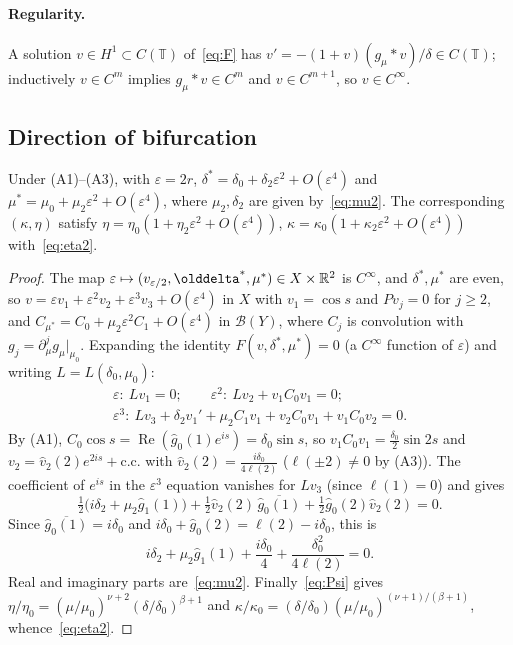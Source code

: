 \documentclass[11pt,a4paper]{report}
\providecommand{\T}{}
\renewcommand{\T}{\mathbb{T}}
\newcommand{\gh}{\hat g}
\begin{document}
\paragraph{Regularity.} A solution $v\in H^1\subset C(\T)$ of~\eqref{eq:F} has $v'=-(1+v)(g_\mu*v)/\delta\in C(\T)$; inductively $v\in C^m$ implies $g_\mu*v\in C^m$ and $v\in C^{m+1}$, so $v\in C^\infty$.

\subsection{Direction of bifurcation}
\begin{proposition}\label{prop:direction}
Under (A1)--(A3), with $\varepsilon=2r$, $\delta^*=\delta_0+\delta_2\varepsilon^2+O(\varepsilon^4)$ and $\mu^*=\mu_0+\mu_2\varepsilon^2+O(\varepsilon^4)$, where $\mu_2,\delta_2$ are given by~\eqref{eq:mu2}. The corresponding $(\kappa,\eta)$ satisfy $\eta=\eta_0(1+\eta_2\varepsilon^2+O(\varepsilon^4))$, $\kappa=\kappa_0(1+\kappa_2\varepsilon^2+O(\varepsilon^4))$ with~\eqref{eq:eta2}.
\end{proposition}
\begin{proof}
The map $\varepsilon\mapsto(v_{\varepsilon/2},\delta^*,\mu^*)\in X\times\R^2$ is $C^\infty$, and $\delta^*,\mu^*$ are even, so $v=\varepsilon v_1+\varepsilon^2v_2+\varepsilon^3v_3+O(\varepsilon^4)$ in $X$ with $v_1=\cos s$ and $Pv_j=0$ for $j\ge2$, and $C_{\mu^*}=C_0+\mu_2\varepsilon^2C_1+O(\varepsilon^4)$ in $\mathcal B(Y)$, where $C_j$ is convolution with $g_j=\partial_\mu^jg_\mu|_{\mu_0}$. Expanding the identity $F(v,\delta^*,\mu^*)=0$ (a $C^\infty$ function of $\varepsilon$) and writing $L=L(\delta_0,\mu_0)$:
\begin{gather*}
\varepsilon:\ Lv_1=0;\qquad
\varepsilon^2:\ Lv_2+v_1C_0v_1=0;\\
\varepsilon^3:\ Lv_3+\delta_2v_1'+\mu_2C_1v_1+v_2C_0v_1+v_1C_0v_2=0 .
\end{gather*}
By (A1), $C_0\cos s=\operatorname{Re}(\gh_0(1)e^{is})=\delta_0\sin s$, so $v_1C_0v_1=\frac{\delta_0}2\sin2s$ and $v_2=\hat v_2(2)e^{2is}+\text{c.c.}$ with $\hat v_2(2)=\frac{i\delta_0}{4\ell(2)}$ ($\ell(\pm2)\ne0$ by (A3)). The coefficient of $e^{is}$ in the $\varepsilon^3$ equation vanishes for $Lv_3$ (since $\ell(1)=0$) and gives
\[
\tfrac12\bigl(i\delta_2+\mu_2\gh_1(1)\bigr)+\tfrac12\hat v_2(2)\,\overline{\gh_0(1)}+\tfrac12\gh_0(2)\hat v_2(2)=0 .
\]
Since $\overline{\gh_0(1)}=i\delta_0$ and $i\delta_0+\gh_0(2)=\ell(2)-i\delta_0$, this is
\[
i\delta_2+\mu_2\gh_1(1)+\frac{i\delta_0}{4}+\frac{\delta_0^2}{4\ell(2)}=0 .
\] Real and imaginary parts are~\eqref{eq:mu2}. Finally~\eqref{eq:Psi} gives $\eta/\eta_0=(\mu/\mu_0)^{\nu+2}(\delta/\delta_0)^{\beta+1}$ and $\kappa/\kappa_0=(\delta/\delta_0)(\mu/\mu_0)^{(\nu+1)/(\beta+1)}$, whence~\eqref{eq:eta2}.
\end{proof}
\end{document}
